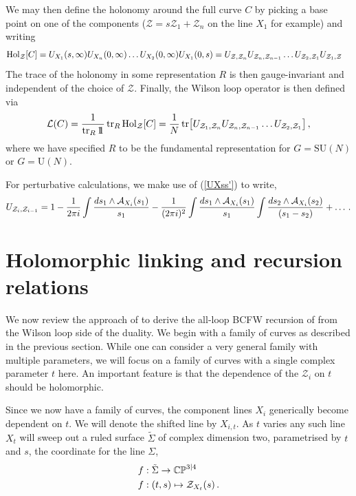 \documentclass[12pt]{article}
\def \be  {\begin{equation}}
\def \ee  {\end{equation}}
\def \tr {\mathop{\rm tr}\nolimits}
\numberwithin{equation}{section}
\begin{document}
We may then define the holonomy around the full curve $C$ by picking a base point on one of the components ($\mathcal{Z} = s \mathcal{Z}_1 + \mathcal{Z}_n$ on the line $X_1$ for example) and writing
\begin{align}
{\rm Hol}_{\mathcal{Z}}[C] &= U_{X_1}(s,\infty)U_{X_n}(0,\infty)\ldots U_{X_2}(0,\infty) U_{X_1}(0,s) = U_{\mathcal{Z},\mathcal{Z}_n} U_{\mathcal{Z}_n,\mathcal{Z}_{n-1}}\ldots U_{\mathcal{Z}_2,\mathcal{Z}_1} U_{\mathcal{Z}_1 ,\mathcal{Z}}
\end{align}
The trace of the holonomy in some representation $R$ is then gauge-invariant and independent of the choice of $\mathcal{Z}$. Finally, the Wilson loop operator is then defined via
\be
\mathcal{L} (C) = \frac{1}{\tr_R 1\!\!1} \tr_R {\rm Hol}_{\mathcal{Z}}[C] =  \frac{1}{N} \tr \bigl[ U_{\mathcal{Z}_1 ,\mathcal{Z}_n} U_{\mathcal{Z}_n,\mathcal{Z}_{n-1}}\ldots U_{\mathcal{Z}_2,\mathcal{Z}_1} \bigr]\,,
\ee
where we have specified $R$ to be the fundamental representation for $G=\textrm{SU}(N)$ or $G=\textrm{U}(N)$.

For perturbative calculations, we make use of (\ref{UXss'}) to write,
\begin{align}
U_{\mathcal{Z}_i,\mathcal{Z}_{i-1}} = 1 - \frac{1}{2 \pi i} \int  \frac{ds_1 \wedge \mathcal{A}_{X_i}(s_1)}{s_1} - \frac{1}{(2 \pi i)^2} \int  \frac{ds_1 \wedge \mathcal{A}_{X_i}(s_1)}{s_1} \int  \frac{ds_2 \wedge \mathcal{A}_{X_i}(s_2)}{(s_1-s_2)} + \ldots\,. \notag
\end{align}


\section{Holomorphic linking and recursion relations}
\label{hololinkintro}

We now review the approach of \cite{Bullimore:2011ni} to derive the all-loop BCFW recursion of \cite{Arkani-Hamed:2010zjl} from the Wilson loop side of the duality. We begin with a family of curves as described in the previous section. While one can consider a very general family with multiple parameters, we will focus on a family of curves with a single complex parameter $t$ here. An important feature is that the dependence of the $\mathcal{Z}_{i}$ on $t$ should be holomorphic. 

Since we now have a family of curves, the component lines $X_i$ generically become dependent on $t$. We will denote the shifted line by $X_{i,t}$. As $t$ varies any such line $X_t$ will sweep out a ruled surface $\tilde{\Sigma}$ of complex dimension two, parametrised by $t$ and $s$, the coordinate for the line $\Sigma$,
\begin{align}
&f: \tilde{\Sigma} \rightarrow \mathbb{CP}^{3|4} \notag \\
&f: (t,s) \mapsto \mathcal{Z}_{X_t}(s)\,.
\end{align}
\end{document}
